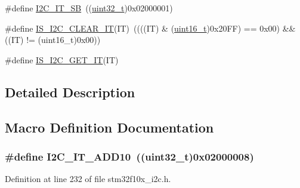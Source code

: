 \begin{DoxyCompactItemize}
\item 
\#define \hyperlink{group___i2_c__interrupts__definition_gaec2fb9bbd0e1b128b4450b2a7b312896}{I2\+C\+\_\+\+I\+T\+\_\+\+SB}~((\hyperlink{_p_e___types_8h_a33594304e786b158f3fb30289278f5af}{uint32\+\_\+t})0x02000001)
\item 
\#define \hyperlink{group___i2_c__interrupts__definition_ga368c05fc9aadd7bb4d23280791b5a751}{I\+S\+\_\+\+I2\+C\+\_\+\+C\+L\+E\+A\+R\+\_\+\+IT}(IT)~((((IT) \& (\hyperlink{_p_e___types_8h_a1f1825b69244eb3ad2c7165ddc99c956}{uint16\+\_\+t})0x20\+F\+F) == 0x00) \&\& ((\+I\+T) != (uint16\+\_\+t)0x00))
\item 
\#define \hyperlink{group___i2_c__interrupts__definition_gab3d113f3d6b6e6f7896c5d7a8d8c2d01}{I\+S\+\_\+\+I2\+C\+\_\+\+G\+E\+T\+\_\+\+IT}(IT)
\end{DoxyCompactItemize}


\subsection{Detailed Description}


\subsection{Macro Definition Documentation}
\subsubsection[{\texorpdfstring{I2\+C\+\_\+\+I\+T\+\_\+\+A\+D\+D10}{I2C_IT_ADD10}}]{\setlength{\rightskip}{0pt plus 5cm}\#define I2\+C\+\_\+\+I\+T\+\_\+\+A\+D\+D10~(({\bf uint32\+\_\+t})0x02000008)}\hypertarget{group___i2_c__interrupts__definition_ga8a9bc5a1dee3bbd41347b19cf117c0f3}{}\label{group___i2_c__interrupts__definition_ga8a9bc5a1dee3bbd41347b19cf117c0f3}


Definition at line 232 of file stm32f10x\+\_\+i2c.\+h.

